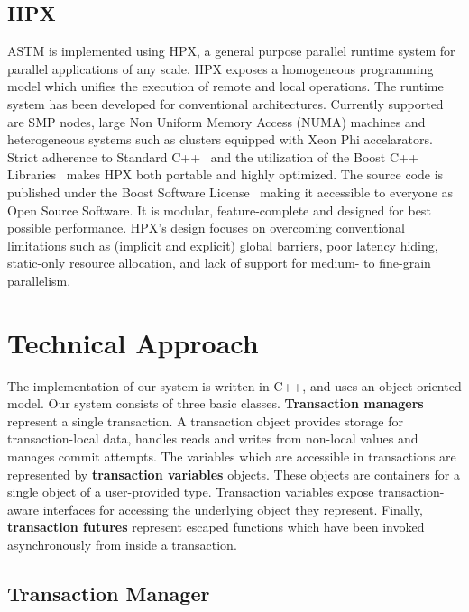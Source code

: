 \documentclass[conference]{IEEEtran}
\begin{document}
\subsection{HPX}

ASTM is implemented using HPX, a general purpose parallel runtime system for parallel applications of any scale.
HPX exposes a homogeneous programming model which unifies the execution of remote
and local operations. The runtime system has been developed for conventional
architectures. Currently supported are SMP nodes, large Non Uniform Memory Access
(NUMA) machines and heterogeneous systems such as clusters equipped with Xeon Phi
accelarators. Strict adherence to Standard C++~\cite{cxx11_standard} and the
utilization of the Boost C++ Libraries~\cite{boostcpplibraries} makes HPX both
portable and highly optimized.
The source code is published under the Boost Software
License~ making it accessible to everyone as Open Source Software.
It is modular, feature-complete and designed for
best possible performance. HPX's design focuses on overcoming conventional
limitations such as (implicit and explicit) global barriers, poor latency hiding,
static-only resource allocation, and lack of support for medium- to fine-grain
parallelism.

\section{Technical Approach}

The implementation of our system is written in C++, and uses an object-oriented model. Our system consists of three basic classes. \textbf{Transaction managers}
represent a single transaction. A transaction object provides storage for transaction-local data, handles reads and writes from non-local values and manages commit attempts. The variables which are accessible in transactions are represented by
\textbf{transaction variables} objects. These objects are containers for a single object of a user-provided type. Transaction variables expose transaction-aware interfaces for accessing the underlying object they represent.
Finally, \textbf{transaction futures} represent escaped functions which have been invoked asynchronously from inside a transaction.

\subsection{Transaction Manager}
\end{document}
